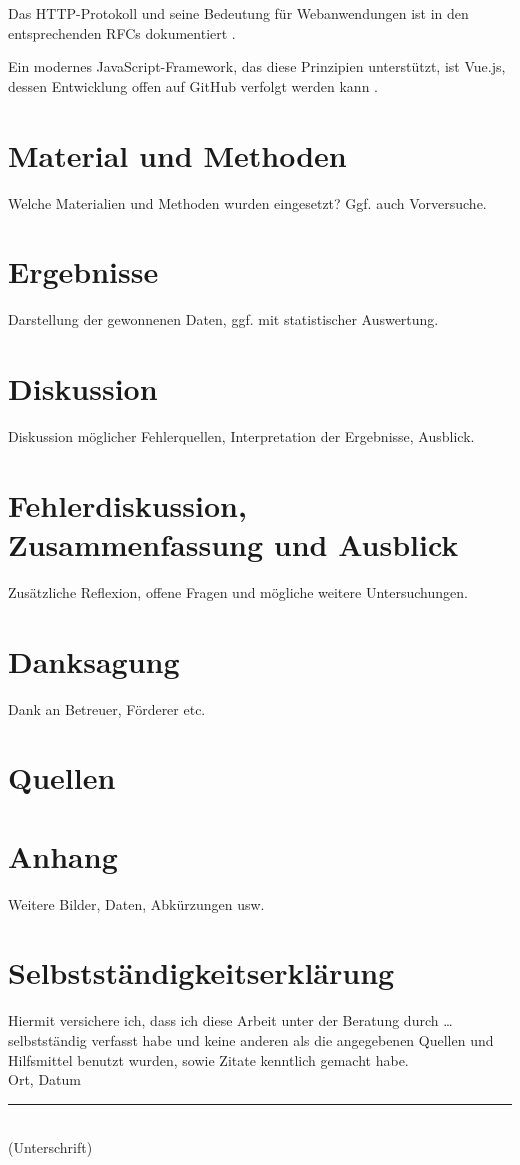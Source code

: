 \documentclass[12pt,a4paper]{article}
\newcommand{\bib}{}
\begin{document}
	Das HTTP-Protokoll und seine Bedeutung für Webanwendungen ist in den entsprechenden RFCs dokumentiert \cite{rfc7231}.
	
	Ein modernes JavaScript-Framework, das diese Prinzipien unterstützt, ist Vue.js, dessen Entwicklung offen auf GitHub verfolgt werden kann \cite{github_vue}.
	
	\section{Material und Methoden}
	Welche Materialien und Methoden wurden eingesetzt? Ggf. auch Vorversuche.
	
	\section{Ergebnisse}
	Darstellung der gewonnenen Daten, ggf. mit statistischer Auswertung.
	
	\section{Diskussion}
	Diskussion möglicher Fehlerquellen, Interpretation der Ergebnisse, Ausblick.
	
	\section{Fehlerdiskussion, Zusammenfassung und Ausblick}
	Zusätzliche Reflexion, offene Fragen und mögliche weitere Untersuchungen.
	
	\section*{Danksagung}
	Dank an Betreuer, Förderer etc.
	
	\section*{Quellen}
	\bib
	
	\appendix
	\section{Anhang}
	Weitere Bilder, Daten, Abkürzungen usw.
	
	\section*{Selbstständigkeitserklärung}
	Hiermit versichere ich, dass ich diese Arbeit unter der Beratung durch … selbstständig verfasst habe und keine anderen als die angegebenen Quellen und Hilfsmittel benutzt wurden, sowie Zitate kenntlich gemacht habe. \\[2cm]
	
	Ort, Datum \hfill \rule{5cm}{0.4pt} \\
	\hfill (Unterschrift)
	
\end{document}
